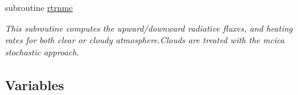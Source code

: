 {\bf }\par
\begin{DoxyCompactItemize}
\item 
subroutine \hyperlink{namespacemodule__radlw__main_a51d42f46321972ffdca4880185506ac5}{rtrnmc}                                                                                               
\begin{DoxyCompactList}\small\item\em This subroutine computes the upward/downward radiative fluxes, and heating rates for both clear or cloudy atmosphere.\+Clouds are treated with the mcica stochastic approach. \end{DoxyCompactList}\end{DoxyCompactItemize}

\subsection*{Variables}
